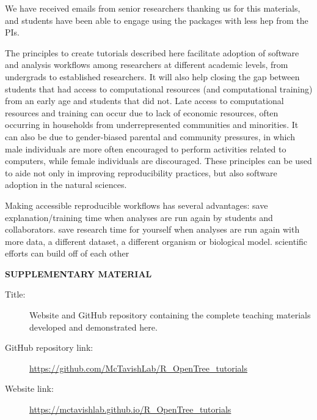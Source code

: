 \documentclass[12pt]{article}
\begin{document}
We have received emails from senior researchers thanking us for this materials,
 and students have been able to engage using the packages with less hep from the PIs.

The principles to create tutorials described here facilitate adoption of software
 and analysis workflows among researchers at different academic levels, from undergrads
  to established researchers.
It will also help closing the gap between students that had access to computational
 resources (and computational training) from an early age and students that did not.
  Late access to computational resources and training can occur due to lack of
   economic resources, often occurring in households from underrepresented communities
    and minorities.
It can also be due to gender-biased parental and community pressures,
 in which male individuals are more often encouraged to perform activities related to computers,
  while female individuals are discouraged.
These principles can be used to aide not only in improving reproducibility practices,
 but also software adoption in the natural sciences.


Making accessible reproducible workflows has several advantages:
save explanation/training time when analyses are run again by students and collaborators.
save research time for yourself when analyses are run again with more data, a different dataset, a different organism or biological model.
scientific efforts can build off of each other

\bigskip
\begin{center}
{\large\bf SUPPLEMENTARY MATERIAL}
\end{center}

\begin{description}

\item[Title:] Website and GitHub repository containing the complete teaching materials developed and demonstrated here.

\item[GitHub repository link:] \url{https://github.com/McTavishLab/R_OpenTree_tutorials}

\item[Website link:] \url{https://mctavishlab.github.io/R_OpenTree_tutorials}

\end{description}




\end{document}
